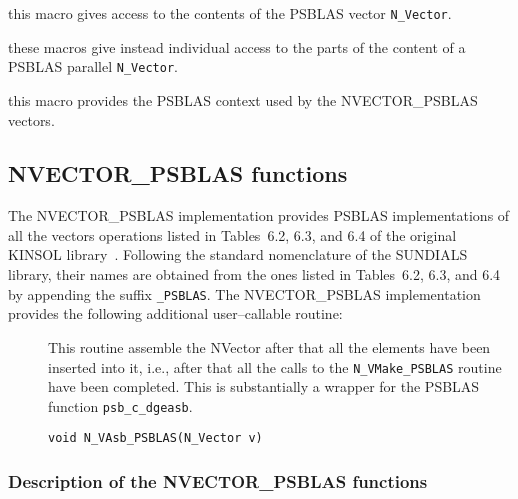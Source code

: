 \documentclass[twoside,a4paper]{refart}
\begin{document}
 this macro gives access to the contents of the PSBLAS vector \texttt{N\_Vector}.

 these macros give instead individual access to the parts of the content of a PSBLAS parallel \texttt{N\_Vector}.  

 this macro provides the PSBLAS context used by the NVECTOR\_PSBLAS vectors.

\subsection{NVECTOR\_PSBLAS functions}

The NVECTOR\_PSBLAS implementation provides PSBLAS implementations of all the vectors operations listed in Tables~6.2, 6.3, and 6.4 of the original KINSOL library~\cite{kinsolguide}. Following the standard nomenclature of the SUNDIALS library, their names are obtained from the ones listed in Tables~6.2, 6.3, and 6.4 by appending the suffix \texttt{\_PSBLAS}. The NVECTOR\_PSBLAS implementation provides the following additional user--callable routine:

\begin{description}
	\item[] This routine assemble the NVector after that all the elements have been inserted into it, i.e., after that all the calls to the \texttt{N\_VMake\_PSBLAS} routine have been completed. This is substantially a wrapper for the PSBLAS function \lstinline[style=CStyle]|psb_c_dgeasb|.

	 \lstinline[style=CStyle]|void N_VAsb_PSBLAS(N_Vector v)|
\end{description}

\subsubsection{Description of the NVECTOR\_PSBLAS functions}
\end{document}
